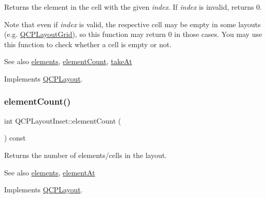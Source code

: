Returns the element in the cell with the given {\itshape index}. If {\itshape index} is invalid, returns 0.

Note that even if {\itshape index} is valid, the respective cell may be empty in some layouts (e.\+g. \hyperlink{classQCPLayoutGrid}{Q\+C\+P\+Layout\+Grid}), so this function may return 0 in those cases. You may use this function to check whether a cell is empty or not.

\begin{DoxySeeAlso}{See also}
\hyperlink{classQCPLayout_aca129722c019f91d3367046f80abfa77}{elements}, \hyperlink{classQCPLayoutInset_a7f5aa4d48a2e844cfe6dd7ed8f0861df}{element\+Count}, \hyperlink{classQCPLayoutInset_abf2e8233f5b7051220907e62ded490a2}{take\+At} 
\end{DoxySeeAlso}


Implements \hyperlink{classQCPLayout_afa73ca7d859f8a3ee5c73c9b353d2a56}{Q\+C\+P\+Layout}.

\mbox{\label{classQCPLayoutInset_a7f5aa4d48a2e844cfe6dd7ed8f0861df}} 
\subsubsection{\texorpdfstring{element\+Count()}{elementCount()}}
{\footnotesize\ttfamily int Q\+C\+P\+Layout\+Inset\+::element\+Count (\begin{DoxyParamCaption}{ }\end{DoxyParamCaption}) const\hspace{0.3cm}{\ttfamily [virtual]}}

Returns the number of elements/cells in the layout.

\begin{DoxySeeAlso}{See also}
\hyperlink{classQCPLayout_aca129722c019f91d3367046f80abfa77}{elements}, \hyperlink{classQCPLayoutInset_a881ca205605bae9c034733b808f93a02}{element\+At} 
\end{DoxySeeAlso}


Implements \hyperlink{classQCPLayout_a39d3e9ef5d9b82ab1885ba1cb9597e56}{Q\+C\+P\+Layout}.

\mbox{\label{classQCPLayoutInset_a5b33b66f0abbb4a7cc2f8aa6c94cf7f8}} 
